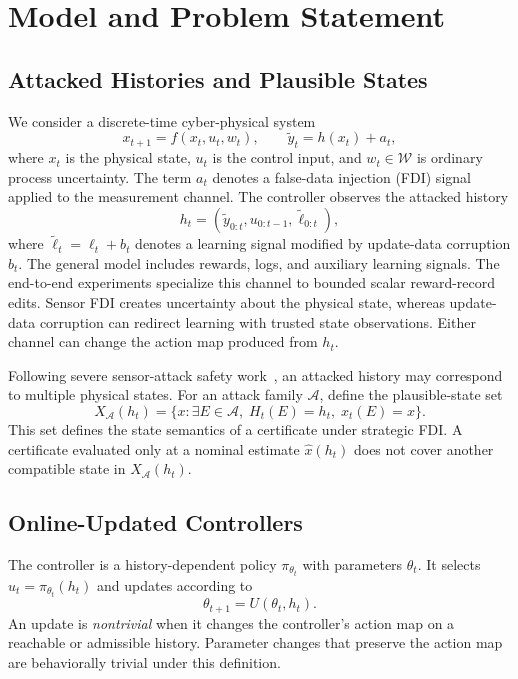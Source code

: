 \section{Model and Problem Statement}
\label{sec:model}

\subsection{Attacked Histories and Plausible States}

We consider a discrete-time cyber-physical system
\begin{equation}
    x_{t+1}=f(x_t,u_t,w_t), \qquad
    \widetilde y_t=h(x_t)+a_t,
\end{equation}
where $x_t$ is the physical state, $u_t$ is the control input, and
$w_t\in\mathcal W$ is ordinary process uncertainty.  The term $a_t$ denotes a
false-data injection (FDI) signal applied to the measurement channel.  The
controller observes the attacked history
\begin{equation}
    h_t=(\widetilde y_{0:t},u_{0:t-1},\widetilde\ell_{0:t}),
\end{equation}
where $\widetilde\ell_t=\ell_t+b_t$ denotes a learning signal modified by
update-data corruption $b_t$.  The general model includes rewards, logs, and
auxiliary learning signals.  The end-to-end experiments specialize this
channel to bounded scalar reward-record edits.  Sensor FDI creates uncertainty
about the physical state, whereas update-data corruption can redirect learning
with trusted state observations.  Either channel can change the action map
produced from $h_t$.

Following severe sensor-attack safety work~\cite{tan_safety_2024}, an attacked
history may correspond to multiple physical states.  For an attack family
$\mathcal A$, define the plausible-state set
\begin{equation}
    X_{\mathcal A}(h_t)=\{x:\exists E\in\mathcal A,\; H_t(E)=h_t,\; x_t(E)=x\}.
\end{equation}
This set defines the state semantics of a certificate under strategic FDI.  A
certificate evaluated only at a nominal estimate $\hat x(h_t)$ does not cover
another compatible state in $X_{\mathcal A}(h_t)$.

\subsection{Online-Updated Controllers}

The controller is a history-dependent policy $\pi_{\theta_t}$ with parameters
$\theta_t$.  It selects $u_t=\pi_{\theta_t}(h_t)$ and updates according to
\begin{equation}
    \theta_{t+1}=U(\theta_t,h_t).
\end{equation}
An update is \emph{nontrivial} when it changes the controller's action map on a
reachable or admissible history.  Parameter changes that preserve the action
map are behaviorally trivial under this definition.

